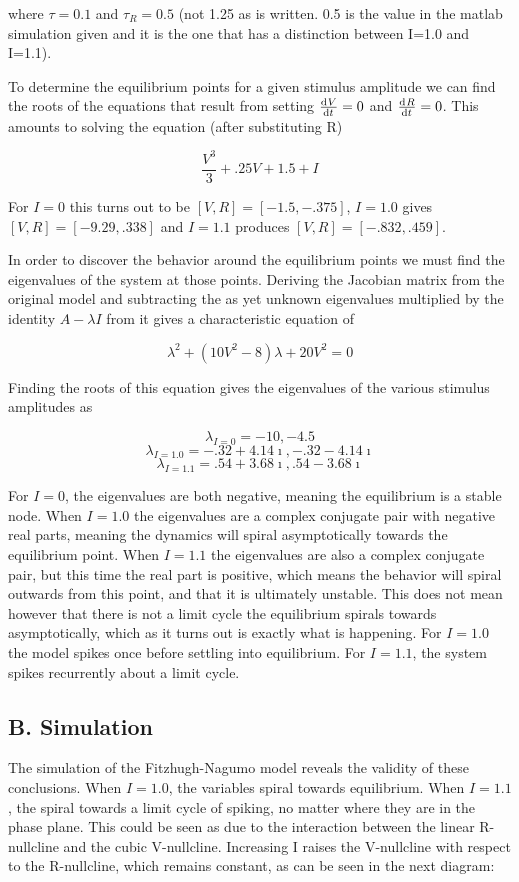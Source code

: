 \documentclass[12pt]{article}
\begin{document}
where $\tau=0.1$ and $\tau_R=0.5$ (not 1.25 as is written.  0.5 is the value in the matlab simulation given and it is the one that has a distinction between I=1.0 and I=1.1).  

To determine the equilibrium points for a given stimulus amplitude we can find the roots of the equations that result from setting $\od{V}{t}=0$ and $\od{R}{t}=0$.  This amounts to solving the equation (after substituting R)

$$ \frac{V^3}{3}+.25V+1.5+I $$

For $I=0$ this turns out to be $[V,R]=[-1.5,-.375]$, $I=1.0$ gives $[V,R]=[-9.29,.338]$ and $I=1.1$ produces $[V,R]=[-.832,.459]$.  

In order to discover the behavior around the equilibrium points we must find the eigenvalues of the system at those points.  Deriving the Jacobian matrix from the original model and subtracting the as yet unknown eigenvalues multiplied by the identity $A-\lambda I$ from it gives a characteristic equation of 

$$ \lambda^2+(10V^2-8)\lambda+20V^2=0 $$

Finding the roots of this equation gives the eigenvalues of the various stimulus amplitudes as

$$ \lambda_{I=0}=-10,-4.5 $$
$$ \lambda_{I=1.0}=-.32+4.14\imath,-.32-4.14\imath $$
$$ \lambda_{I=1.1}=.54+3.68\imath,.54-3.68\imath $$

For $I=0$, the eigenvalues are both negative, meaning the equilibrium is a stable node.  When $I=1.0$ the eigenvalues are a complex conjugate pair with negative real parts, meaning the dynamics will spiral asymptotically towards the equilibrium point.  When $I=1.1$ the eigenvalues are also a complex conjugate pair, but this time the real part is positive, which means the behavior will spiral outwards from this point, and that it is ultimately unstable.  This does not mean however that there is not a limit cycle the equilibrium spirals towards asymptotically, which as it turns out is exactly what is happening.  For $I=1.0$ the model spikes once before settling into equilibrium.  For $I=1.1$, the system spikes recurrently about a limit cycle.

\subsection{B. Simulation}

The simulation of the Fitzhugh-Nagumo model reveals the validity of these conclusions.  When $I=1.0$, the variables spiral towards equilibrium.  When $I=1.1$, the spiral towards a limit cycle of spiking, no matter where they are in the phase plane.  This could be seen as due to the interaction between the linear R-nullcline and the cubic V-nullcline.  Increasing I raises the V-nullcline with respect to the R-nullcline, which remains constant, as can be seen in the next diagram:
\end{document}
